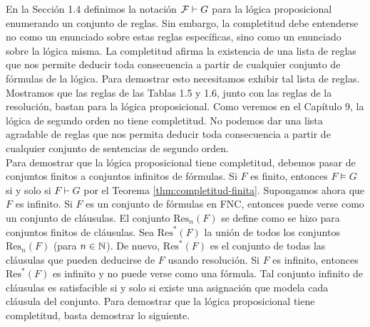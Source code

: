 \message{ !name(main.tex)}\documentclass[12pt,a4paper]{book}
\begin{document}
    En la Sección 1.4 definimos la notación $\mathcal{F}\vdash G$ para la lógica proposicional enumerando un conjunto de reglas. Sin
    embargo, la completitud debe entenderse no como un enunciado sobre estas reglas específicas, sino como un enunciado
    sobre la lógica misma. La completitud afirma la existencia de una lista de reglas que nos permite deducir toda
    consecuencia a partir de cualquier conjunto de fórmulas de la lógica. Para demostrar esto necesitamos exhibir tal lista
    de reglas. Mostramos que las reglas de las Tablas 1.5 y 1.6, junto con las reglas de la resolución, bastan para la
    lógica proposicional. Como veremos en el Capítulo 9, la lógica de segundo orden no tiene completitud. No podemos dar una
    lista agradable de reglas que nos permita deducir toda consecuencia a partir de cualquier conjunto de sentencias de
    segundo orden.\\
    Para demostrar que la lógica proposicional tiene completitud, debemos pasar de conjuntos finitos a conjuntos infinitos
    de fórmulas. Si $F$ es finito, entonces $F\models G$ si y solo si $F\vdash G$ por el Teorema
    \ref{thm:completitud-finita}. Supongamos ahora que $F$ es infinito. Si $F$ es un conjunto de fórmulas en FNC, entonces
    puede verse como un conjunto de cláusulas. El conjunto $\mathrm{Res}_{n}(F)$ se define como se hizo para conjuntos
    finitos de cláusulas. Sea $\mathrm{Res}^{*}(F)$ la unión de todos los conjuntos $\mathrm{Res}_{n}(F)$ (para $n\in\mathbb{N}$). De
    nuevo, $\mathrm{Res}^{*}(F)$ es el conjunto de todas las cláusulas que pueden deducirse de $F$ usando resolución. Si $F$
    es infinito, entonces $\mathrm{Res}^{*}(F)$ es infinito y no puede verse como una fórmula. Tal conjunto infinito de
    cláusulas es satisfacible si y solo si existe una asignación que modela cada cláusula del conjunto. Para demostrar que
    la lógica proposicional tiene completitud, basta demostrar lo siguiente.
\end{document}
